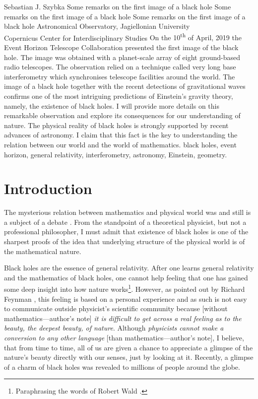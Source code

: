 \begin{artengenv}{Sebastian J. Szybka}
	{Some remarks on the first image of a black hole}
	{Some remarks on the first image of a black hole}
	{Some remarks on the first image of a black hole}
	{Astronomical Observatory, Jagiellonian University\\
	Copernicus Center for Interdisciplinary Studies}
	{On the 10\textsuperscript{th} of April, 2019 the Event Horizon Telescope Collaboration presented the first image of the black hole. The image was obtained with a planet-scale array of eight ground-based radio telescopes. The observation relied on a technique called very long base interferometry which synchronises telescope facilities around the world. The image of a black hole together with the recent detections of gravitational waves confirms one of the most intriguing predictions of Einstein's gravity theory, namely, the existence of black holes. I will provide more details on this remarkable observation and explore its consequences for our understanding of nature. The physical reality of black holes is strongly supported by recent advances of astronomy. I claim that this fact is the key to understanding the relation between our world and the world of mathematics.}
	{black holes, event horizon, general relativity, interferometry, astronomy, Einstein, geometry.}


\section{Introduction}
\indent \lettrine[loversize=0.13,lines=2,lraise=-0.05,nindent=0em,findent=0.2pt]%
{T}{}he mysterious relation between mathematics and physical world was and still is a subject of a debate \parencite{wigner_unreasonable_1960}. From the standpoint of a theoretical physicist, but not a professional philosopher, I must admit that existence of black holes is one of the sharpest proofs of the idea that underlying structure of the physical world is of the mathematical nature. 

Black holes are the essence of general relativity. After one learns general relativity and the mathematics of black holes, one cannot help feeling that one has gained some deep insight into how nature works\footnote{Paraphrasing the words of Robert Wald \parencite*{wald_general_1984}.}.  However, as pointed out by Richard Feynman \parencite*{feynman_character_1967}, this feeling is based on a personal experience and as such is not easy to communicate outside physicist's scientific community because  [without mathematics---author's note] \textit{it is difficult to get across a real feeling as to the beauty, the deepest beauty, of nature}. Although \textit{physicists cannot make a conversion to any other language} [than mathematics---author's note], I believe, that from time to time, all of us are given a chance to appreciate a glimpse of the nature's beauty directly with our senses, just by looking at it. Recently, a glimpse of a charm of black holes was revealed to millions of people around the globe.


\end{artengenv}
